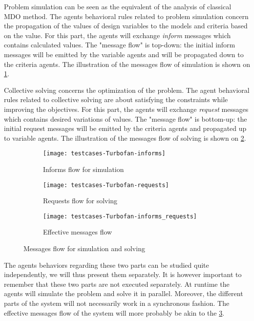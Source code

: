 Problem simulation can be seen as the equivalent of the analysis of classical MDO method. The agents behavioral rules related to problem simulation concern the propagation of the values of design variables to the models and criteria based on the value. For this part, the agents will exchange \emph{inform} messages which contains calculated values. The "message flow" is top-down: the initial inform messages will be emitted by the variable agents and will be propagated down to the criteria agents. The illustration of the messages flow of simulation is shown on \figurename{} \ref{messages_flow:inf}.

Collective solving concerns the optimization of the problem. The agent behavioral rules related to collective solving are about satisfying the constraints while improving the objectives. For this part, the agents will exchange \emph{request} messages which contains desired variations of values. The "message flow" is bottom-up: the initial request messages will be emitted by the criteria agents and propagated up to variable agents. The illustration of the messages flow of solving is shown on \figurename{} \ref{messages_flow:req}.

\begin{figure}[h]
	\begin{subfigure}[b]{0.4\textwidth}
		\centering
		\texttt{[image: testcases-Turbofan-informs]}
		\caption{Informs flow for simulation}\label{messages_flow:inf}
	\end{subfigure}
	\hfill
  	\begin{subfigure}[b]{0.4\textwidth}
		\centering
		\texttt{[image: testcases-Turbofan-requests]}
		\caption{Requests flow for solving}\label{messages_flow:req}
	\end{subfigure}

	\centering
	 \begin{subfigure}[b]{0.4\textwidth}
		\texttt{[image: testcases-Turbofan-informs\_requests]}
		\caption{Effective messages flow}\label{messages_flow:eff}
	\end{subfigure}
	
	\caption{Messages flow for simulation and solving}
	\label{messages_flow}

\end{figure}

The agents behaviors regarding these two parts can be studied quite independently, we will thus present them separately.  It is however important to remember that these two parts are not executed separately. At runtime the agents will simulate the problem and solve it in parallel. Moreover, the different parts of the system will not necessarily work in a synchronous fashion. The effective messages flow of the system will more probably be akin to the \figurename{} \ref{messages_flow:eff}.

